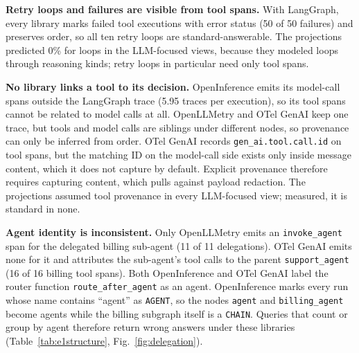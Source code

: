 \documentclass[conference]{IEEEtran}
\begin{document}
\textbf{Retry loops and failures are visible from tool spans.} With
LangGraph, every library marks failed tool executions with error status
(50 of 50 failures) and preserves order, so all ten retry loops are
standard-answerable. The projections predicted 0\% for loops in the
LLM-focused views, because they modeled loops through reasoning kinds;
retry loops in particular need only tool spans.

\textbf{No library links a tool to its decision.} OpenInference emits
its model-call spans outside the LangGraph trace (5.95 traces per
execution), so its tool spans cannot be related to model calls at all.
OpenLLMetry and OTel GenAI keep one trace, but tools and model calls
are siblings under different nodes, so provenance can only be inferred
from order. OTel GenAI records \texttt{gen\_ai.tool.call.id} on tool
spans, but the matching ID on the model-call side exists only inside
message content, which it does not capture by default. Explicit
provenance therefore requires capturing content, which pulls against
payload redaction. The projections assumed tool provenance in every
LLM-focused view; measured, it is standard in none.

\textbf{Agent identity is inconsistent.} Only OpenLLMetry emits an
\texttt{invoke\_agent} span for the delegated billing sub-agent (11 of
11 delegations). OTel GenAI emits none for it and attributes the
sub-agent's tool calls to the parent \texttt{support\_agent} (16 of 16
billing tool spans). Both OpenInference and OTel GenAI label the router
function \texttt{route\_after\_agent} as an agent. OpenInference marks
every run whose name contains ``agent'' as \texttt{AGENT}, so the nodes
\texttt{agent} and \texttt{billing\_agent} become agents while the
billing subgraph itself is a \texttt{CHAIN}.
Queries that count or group by agent therefore return wrong answers
under these libraries (Table~\ref{tab:e1structure}, Fig.~\ref{fig:delegation}).
\end{document}
